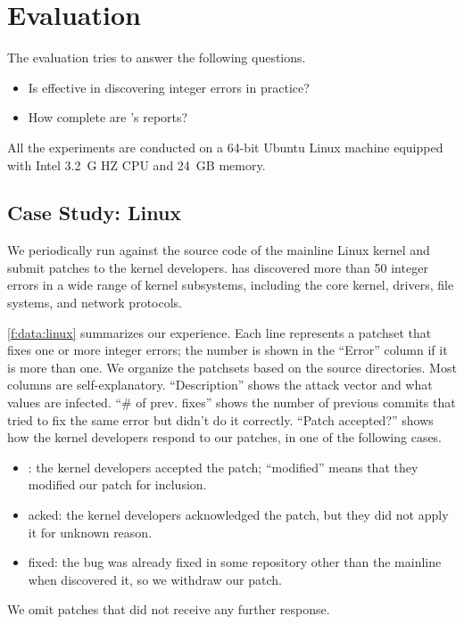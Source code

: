 \section{Evaluation}
\label{s:eval}

The evaluation tries to answer the following questions.
\begin{itemize}
\item
Is \sys effective in discovering integer errors in practice?
\item
How complete are \sys's reports?
\end{itemize}

All the experiments are conducted on a 64-bit Ubuntu Linux machine
equipped with Intel 3.2~G HZ CPU and 24~GB memory.

\subsection{Case Study: Linux}
\label{s:eval:linux}

We periodically run \sys against the source code of the mainline
Linux kernel and submit patches to the kernel developers.  \sys has
discovered more than 50 integer errors in a wide range of kernel
subsystems, including the core kernel, drivers, file systems, and
network protocols.

\autoref{f:data:linux} summarizes our experience.  Each line
represents a patchset that fixes one or more integer errors; the
number is shown in the ``Error'' column if it is more than one.  We
organize the patchsets based on the source directories.  Most
columns are self-explanatory.  ``Description'' shows the attack
vector and what values are infected.  ``\# of prev. fixes'' shows
the number of previous commits that tried to fix the same error but
didn't do it correctly.  ``Patch accepted?'' shows how the kernel
developers respond to our patches, in one of the following cases.
\begin{itemize}
\item
\ok: the kernel developers accepted the patch;
``modified'' means that they modified our patch for inclusion.
\item
acked: the kernel developers acknowledged the patch, but they
did not apply it for unknown reason.
\item
fixed: the bug was already fixed in some repository other than the
mainline when \sys discovered it, so we withdraw our patch.
\end{itemize}
We omit patches that did not receive any further response.

